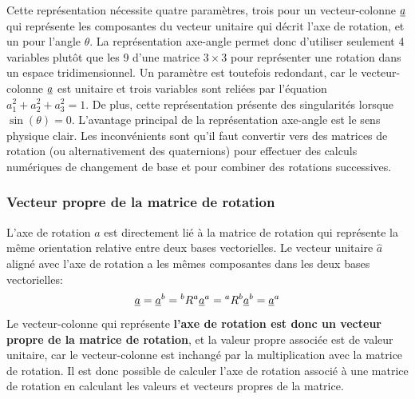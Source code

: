 Cette représentation nécessite quatre paramètres, trois pour un vecteur-colonne $\underline{a}$ qui représente les composantes du vecteur unitaire qui décrit l'axe de rotation, et un pour l'angle $\theta$. La représentation axe-angle permet donc d'utiliser seulement 4 variables plutôt que les 9 d'une matrice $3\times3$ pour représenter une rotation dans un espace tridimensionnel. Un paramètre est toutefois redondant, car le vecteur-colonne $\underline{a}$ est unitaire et trois variables sont reliées par l'équation $a_{1}^2+a_{2}^2+a_{3}^2=1$. De plus, cette représentation présente des singularités lorsque $\sin(\theta)=0$. L'avantage principal de la représentation axe-angle est le sens physique clair. Les inconvénients sont qu'il faut convertir vers des matrices de rotation (ou alternativement des quaternions) pour effectuer des calculs numériques de changement de base et pour combiner des rotations successives.



\subsubsection{Vecteur propre de la matrice de rotation}
L'axe de rotation $\hat{a}$ est directement lié à la matrice de rotation qui représente la même orientation relative entre deux bases vectorielles. Le vecteur unitaire $\hat{a}$ aligné avec l'axe de rotation a les mêmes composantes dans les deux bases vectorielles:
\begin{equation}
	\underline{a} = \underline{a}^b = {}^bR^a \underline{a}^a = {}^aR^b \underline{a}^b = \underline{a}^a
\end{equation}
Le vecteur-colonne qui représente \textbf{l'axe de rotation est donc un vecteur propre de la matrice de rotation}, et la valeur propre associée est de valeur unitaire, car le vecteur-colonne est inchangé par la multiplication avec la matrice de rotation. Il est donc possible de calculer l'axe de rotation associé à une matrice de rotation en calculant les valeurs et vecteurs propres de la matrice.

